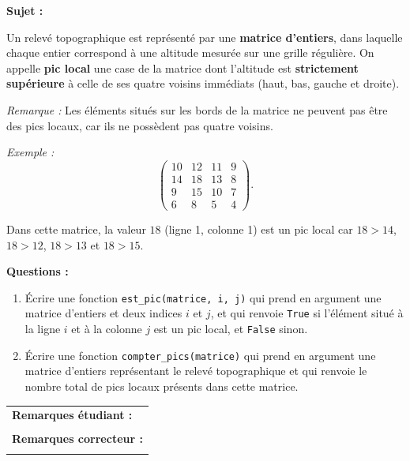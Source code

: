 \documentclass[a4paper,11pt]{article}
\begin{document}
\textbf{Sujet :}

Un relevé topographique est représenté par une \textbf{matrice d’entiers}, dans laquelle chaque
entier correspond à une altitude mesurée sur une grille régulière.
On appelle \textbf{pic local} une case de la matrice dont l’altitude est
\textbf{strictement supérieure} à celle de ses quatre voisins immédiats
(haut, bas, gauche et droite).

\medskip

\textit{Remarque :}  
Les éléments situés sur les bords de la matrice ne peuvent pas être des pics locaux,
car ils ne possèdent pas quatre voisins.

\medskip

\textit{Exemple :}
\[
\begin{pmatrix}
10 & 12 & 11 & 9 \\
14 & 18 & 13 & 8 \\
9  & 15 & 10 & 7 \\
6  & 8  & 5  & 4
\end{pmatrix}.
\]

Dans cette matrice, la valeur \(18\) (ligne 1, colonne 1) est un pic local car
\(18 > 14\), \(18 > 12\), \(18 > 13\) et \(18 > 15\).

\medskip

\textbf{Questions :}

\begin{enumerate}
\item Écrire une fonction \texttt{est\_pic(matrice, i, j)} qui prend en argument une matrice
d’entiers et deux indices \(i\) et \(j\), et qui renvoie \texttt{True} si l’élément situé à la
ligne \(i\) et à la colonne \(j\) est un pic local, et \texttt{False} sinon.

\item Écrire une fonction \texttt{compter\_pics(matrice)} qui prend en argument une matrice
d’entiers représentant le relevé topographique et qui renvoie le nombre total de pics locaux
présents dans cette matrice.
\end{enumerate}




\begin{table}[h!]
\centering
\renewcommand{\arraystretch}{1.4} %
\begin{tabular}{|p{15cm}|}
\hline
\textbf{Remarques étudiant :}    \\
 \\
\hline
\textbf{Remarques correcteur :}  \\
 \\
\hline
\end{tabular}
\end{table}
\end{document}
